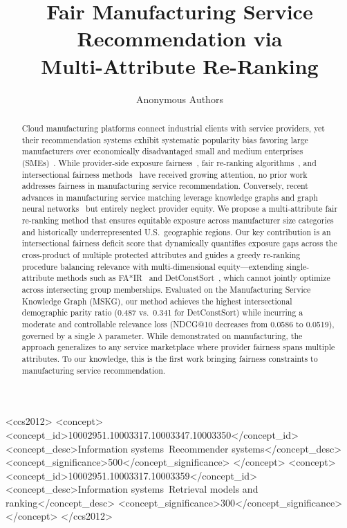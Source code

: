 \documentclass[sigconf,natbib=true]{acmart}
\begin{document}
\title{Fair Manufacturing Service Recommendation via\\Multi-Attribute Re-Ranking}

\author{Anonymous Authors}

\begin{abstract}
Cloud manufacturing platforms connect industrial clients with service providers, yet their recommendation systems exhibit systematic popularity bias favoring large manufacturers over economically disadvantaged small and medium enterprises (SMEs)~\cite{zheng2022cloud, lu2020cloud}. While provider-side exposure fairness~\cite{singh2018fairness, aird2025integrating}, fair re-ranking algorithms~\cite{ye2025bankfair, melucci2025three}, and intersectional fairness methods~\cite{gonzalez2025tutorial, cachel2022manirank} have received growing attention, no prior work addresses fairness in manufacturing service recommendation. Conversely, recent advances in manufacturing service matching leverage knowledge graphs and graph neural networks~\cite{li2024building, wang2025mfg_kggcn, li2024capability} but entirely neglect provider equity. We propose a multi-attribute fair re-ranking method that ensures equitable exposure across manufacturer size categories and historically underrepresented U.S.\ geographic regions. Our key contribution is an intersectional fairness deficit score that dynamically quantifies exposure gaps across the cross-product of multiple protected attributes and guides a greedy re-ranking procedure balancing relevance with multi-dimensional equity---extending single-attribute methods such as FA*IR~\cite{zehlike2017fair} and DetConstSort~\cite{geyik2019fairness}, which cannot jointly optimize across intersecting group memberships. Evaluated on the Manufacturing Service Knowledge Graph (MSKG), our method achieves the highest intersectional demographic parity ratio (0.487 vs.\ 0.341 for DetConstSort) while incurring a moderate and controllable relevance loss (NDCG@10 decreases from 0.0586 to 0.0519), governed by a single $\lambda$ parameter. While demonstrated on manufacturing, the approach generalizes to any service marketplace where provider fairness spans multiple attributes. To our knowledge, this is the first work bringing fairness constraints to manufacturing service recommendation.
\end{abstract}

\begin{CCSXML}
<ccs2012>
<concept>
<concept_id>10002951.10003317.10003347.10003350</concept_id>
<concept_desc>Information systems~Recommender systems</concept_desc>
<concept_significance>500</concept_significance>
</concept>
<concept>
<concept_id>10002951.10003317.10003359</concept_id>
<concept_desc>Information systems~Retrieval models and ranking</concept_desc>
<concept_significance>300</concept_significance>
</concept>
</ccs2012>
\end{CCSXML}
\end{document}

